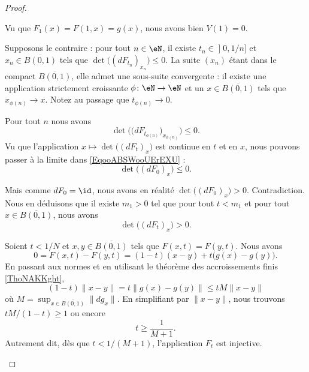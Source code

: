 \begin{proof}
\begin{subproof}
		Vu que \( F_1(x)=F(1,x)=g(x)\), nous avons bien \( V(1)=0\).


		Supposons le contraire : pour tout \( n\in \eN\), il existe \( t_n\in \mathopen] 0,1/n\mathclose]\) et \( x_n\in\overline{B(0,1)}\) tels que \( \det\big( (dF_{t_n})_{x_n} \big)\leq 0\). La suite \( (x_n)\) étant dans le compact \( \overline{B(0,1)}\), elle admet une sous-suite convergente : il existe une application strictement croissante \(\phi \colon \eN\to \eN  \) et un \( x\in\overline{B(0,1)}\) tels que \( x_{\phi(n)}\to x \). Notez au passage que \( t_{\phi(n)}\to 0\).

		Pour tout \( n\) nous avons
		\begin{equation}		\label{EqooABSWooUErEXU}
			\det\Big( \big( dF_{t_{\phi(n)}} \big)_{x_{\phi(n)}} \Big)\leq 0.
		\end{equation}
		Vu que l'application \( x\mapsto \det\big( (dF_t)_x \big)\) est continue en \( t\) et en \( x\), nous pouvons passer à la limite dans \eqref{EqooABSWooUErEXU} :
		\begin{equation}
			\det\Big( (dF_0)_x \Big)\leq 0.
		\end{equation}

		Mais comme \( dF_0=\id\), nous avons en réalité \( \det\big( (dF_0)_x \big)>0\). Contradiction. Nous en déduisons que il existe \( m_1>0\) tel que pour tout \( t<m_1\) et pour tout \( x\in\overline{B(0,1)}\), nous avons
		\begin{equation}
			\det\Big( (dF_t)_x \Big)>0.
		\end{equation}


		Soient \( t<1/N\) et \( x,y\in\overline{B(0,1)}\) tels que \( F(x,t)=F(y,t)\). Nous avons
		\begin{equation}
			0=F(x,t)-F(y,t)=(1-t)(x-y)+t\big( g(x)-g(y) \big).
		\end{equation}
		En passant aux normes et en utilisant le théorème des accroissements finis \ref{ThoNAKKght},
		\begin{equation}
			(1-t)\| x-y \|=t\| g(x)-g(y) \|\leq tM\| x-y \|
		\end{equation}
		où \( M=\sup_{x\in \overline{B(0,1)}}\| dg_x \|\). En simplifiant par \( \| x-y \|\), nous trouvons \( tM/(1-t)\geq 1\) ou encore
		\begin{equation}
			t\geq \frac{1}{ M+1}.
		\end{equation}
		Autrement dit, dès que \( t<1/(M+1)\), l'application \( F_t\) est injective.


\end{subproof}
\end{proof}
